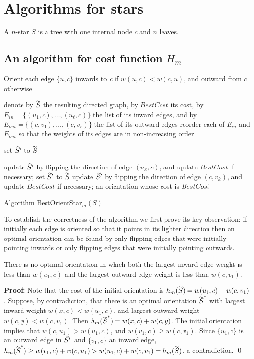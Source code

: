  \section{Algorithms for stars}\label{s.1}
 A $n$-star $S$ is a tree with one internal node $c$ and $n$ leaves.

 \subsection{An algorithm for cost function $H_m$}
 \begin{algorithm}
 	
Orient each edge $\{u,c\}$ inwards to \textit{c} if $w(u,c)<w(c,u)$,
and outward from $c$ otherwise\; \label{i0}
 	 
denote by $\tildeb{S}$ the resulting directed graph, by $BestCost$ its cost, 
by $E_{in}=\{(u_1,c),\ldots, (u_{\ell},c)\}$ the list of its inward edges, 
and by $E_{out}=\{(c,v_1),\ldots, (c,v_r)\}$ the list of its outward edges\;
\label{i00} reorder each of $E_{in}$ and $E_{out}$ so that
the weights of its edges are in non-increasing order\;

set $\tildeb{S'}$ to $\tildeb{S}$\;

  {update $\tildeb{S'}$ by flipping the direction of edge $(u_k,c)$, and update $BestCost$ if necessary;}
   \label{i1} 
set $\tildeb{S'}$ to $\tildeb{S}$\;
   {update $\tildeb{S'}$ by flipping the direction of edge $(c,v_k)$, and update $BestCost$ if necessary;}
  \label{i2}
 	\Return an orientation whose cost is $BestCost$\;
 	\caption{Algorithm BestOrientStar$_m (S)$}
 	\label{algo:os-s}
 \end{algorithm}

\bigskip

To establish the correctness of the algorithm we first prove its key observation:  
if initially  each edge is oriented
so that it points in its lighter direction then an optimal orientation can be
found by only flipping edges that were initially pointing inwards or only
flipping edges that were initially pointing outwards. 
\begin{lemma}\label{l.best}
	There is no optimal orientation in which both the largest inward edge weight is less than $w(u_1,c)$ 
	and the largest outward edge weight is less than $w(c,v_1)$.
\end{lemma}

\noindent \textbf{Proof:}
Note that the cost of the initial orientation is $h_m(\tildeb{S})=w(u_1,c)+w(c,v_1)$.
Suppose, by contradiction, that there is an optimal orientation $\tildeb{S}^*$ 
with largest inward weight $w(x,c)< w(u_1,c)$,
and largest outward weight $w(c,y)<w(c,v_1)$.
Then $h_m(\tildeb{S}^*)=w(x,c)+w(c,y)$.
The initial orientation implies that $w(c,u_1) > w(u_1,c)$, and $w(v_1,c) \geq w(c,v_1)$.
Since $\{u_1,c\}$ is an outward edge in $\tildeb{S^*}$ and $\{v_1,c\}$ an inward edge,
$h_m(\tildeb{S}^*)\geq  
w(v_1,c)+w(c,u_1) >  w(u_1,c)+w(c,v_1) =h_m(\tildeb{S})$, a contradiction.
\qed

